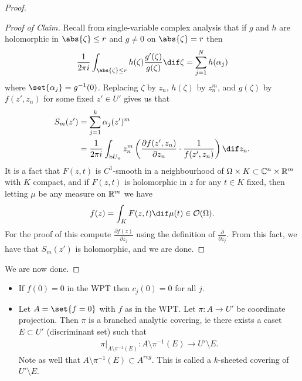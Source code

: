 \begin{proof}
\begin{proof}[Proof of Claim]
    Recall from single-variable complex analysis that if $g$ and $h$ are holomorphic in $\abs{\zeta} \leq r$ and $g \neq 0$ on $\abs{\zeta} = r$ then
    \begin{align*}
        \frac{1}{2 \pi i} \int_{\abs{\zeta} \leq r} h(\zeta) \frac{g'(\zeta)}{g(\zeta)} \dif \zeta = \sum_{j=1}^N h(\alpha_j)
    \end{align*}
    where $\set{\alpha_j} = g^{-1}(0)$. Replacing $\zeta$ by $z_n$, $h(\zeta)$ by $z_n^m$, and $g(\zeta) $ by $f(z' , z_n)$ for some fixed $z' \in U'$ gives us that
    \begin{align*}
        S_m(z') &= \sum_{j=1}^k \alpha_j(z')^m\\
        &= \frac{1}{2 \pi i} \int_{\bdy U_n} z_n^m \br{ \frac{\partial f(z',z_n)}{\partial z_n}  \cdot \frac{1}{f(z',z_n)} } \dif z_n.
    \end{align*}
    It is a fact that $F(z,t) $ is $C^1$-smooth in a neighbourhood of $\Omega \times K \subset \mathbb{C}^n \times \mathbb{R}^m$ with $K $ compact, and if $F(z,t) $ is holomorphic in $z$ for any $t \in K$ fixed, then letting $\mu$ be any measure on $\mathbb{R}^m$ we have
    \begin{align*}
        f(z) = \int_K F(z,t) \dif \mu(t) \in \O(\om).
    \end{align*}
    For the proof of this compute $\frac{\partial f(z)}{\partial \overline{z_j}}$ using the definition of $\frac{\partial}{\partial \overline{z_j}}$. From this fact, we have that $S_m(z')$ is holomorphic, and we are done.
\end{proof}
    We are now done.
\end{proof}

\begin{remark}
    \hphantom{.}
    \begin{itemize}
        \item If $f(0) = 0$ in the WPT then $c_j(0) = 0$ for all $j$.
        \item Let $A = \set{f = 0}$ with $f$ as in the WPT. Let $\pi : A \to U'$ be coordinate projection. Then $\pi$ is a branched analytic covering, ie there exists a caset $E \subset U' $ (discriminant set) such that
        \begin{align*}
            \pi \big|_{A \setminus \pi^{-1} (E) } : A \setminus \pi^{-1}(E) \to U' \setminus E.
        \end{align*}
        Note as well that $A \setminus \pi^{-1} (E) \subset A^{reg}$. This is called a $k$-sheeted covering of $U' \setminus E$.
    \end{itemize}
\end{remark}

